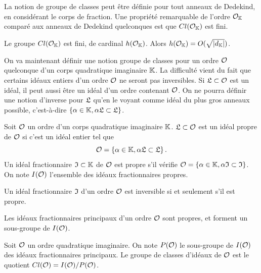 La notion de groupe de classes peut être définie pour tout anneaux de Dedekind, en considérant le corps de fraction. Une propriété remarquable de l'ordre $\mathcal{O}_{\mathbb{K}}$ comparé aux anneaux de Dedekind quelconques est que $Cl(\mathcal{O}_{\mathbb{K}})$ est fini. 

\begin{Prop}
	
	Le groupe $Cl(\mathcal{O}_{\mathbb{K}})$ est fini, de cardinal $h(\mathcal{O}_{\mathbb{K}})$. Alors $h(\mathcal{O}_{\mathbb{K}}) = O(\sqrt{|d_{\mathbb{K}}|})$.
\end{Prop} 


On va maintenant définir une notion groupe de classes pour un ordre $\mathcal{O}$ quelconque d'un corps quadratique imaginaire $\mathbb{K}$. La difficulté vient du fait que certains idéaux entiers d'un ordre $\mathcal{O}$ ne seront pas inversibles. Si $\mathfrak{L}\subset\mathcal{O}$ est un idéal, il peut aussi être un idéal d'un ordre contenant $\mathcal{O}$. On ne pourra définir une notion d'inverse pour $\mathfrak{L}$ qu'en le voyant comme idéal du plus gros anneaux possible, c'est-à-dire $\left\lbrace \alpha\in\mathbb{K}, \alpha\mathfrak{L}\subset\mathfrak{L}\right\rbrace$. 

\begin{Def}
	Soit $\mathcal{O}$ un ordre d'un corps quadratique imaginaire $\mathbb{K}$. $\mathfrak{L}\subset\mathcal{O}$ est un idéal propre de $\mathcal{O}$ si c'est un idéal entier tel que
	\begin{equation*}
		\mathcal{O} = \left\lbrace \alpha\in\mathbb{K}, \alpha\mathfrak{L}\subset\mathfrak{L}\right\rbrace.
	\end{equation*} 
	Un idéal fractionnaire $\mathfrak{I}\subset\mathbb{K}$ de $\mathcal{O}$ est propre s'il vérifie $\mathcal{O} = \left\lbrace \alpha\in\mathbb{K}, \alpha\mathfrak{I}\subset\mathfrak{I}\right\rbrace$. On note $I(\mathcal{O})$ l'ensemble des idéaux fractionnaires propres.
\end{Def}

\begin{Prop}
	
	Un idéal fractionnaire $\mathfrak{I}$ d'un ordre $\mathcal{O}$ est inversible si et seulement s'il est propre.
\end{Prop}

\begin{Coro}
	Les idéaux fractionnaires principaux d'un ordre $\mathcal{O}$ sont propres, et forment un sous-groupe de $I(\mathcal{O})$.
\end{Coro}

\begin{Def}
	Soit $\mathcal{O}$ un ordre quadratique imaginaire. On note $P(\mathcal{O})$ le sous-groupe de $I(\mathcal{O})$ des idéaux fractionnaires principaux. Le groupe de classes d'idéaux de $\mathcal{O}$ est le quotient $Cl(\mathcal{O}) =  I(\mathcal{O})/P(\mathcal{O})$.
\end{Def}

